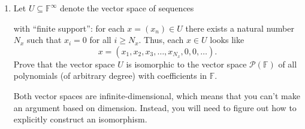 \documentclass[letterpaper,12pt]{article}
\begin{document}
\begin{enumerate}
 \item Let $U\subseteq \mathbb{F}^\infty$ denote the vector space of sequences

with ``finite support'': for each $x=(x_n)\in U$ there exists a natural number $N_x$ such that $x_i=0$ for all $i\geq N_x$. Thus, each $x\in U$ looks like
\[
 x = (x_1,x_2,x_3,\ldots, x_{N_x}, 0, 0, \ldots).
\]
Prove that the vector space $U$ is isomorphic to the vector space $\mathcal{P}(\mathbb{F})$ of all polynomials (of arbitrary degree) with coefficients in $\mathbb{F}$.

  Both vector spaces are infinite-dimensional, which means that you can't make an argument based on dimension. Instead, you will need to figure out how to explicitly construct an isomorphism.
 \end{enumerate}
\end{document}
